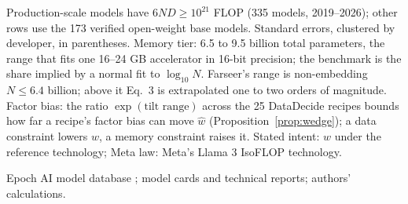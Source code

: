 \begin{table}[tp]
\begin{tabular}{@{}>{\raggedright\arraybackslash}p{}>{\raggedright\arraybackslash}p{}>{\raggedright\arraybackslash}p{}@{}}
\bottomrule
\end{tabular}
\par\smallskip
\begin{tablenotes}Production-scale models have $6ND\geq10^{21}$ FLOP (335 models, 2019--2026); other rows use the 173
verified open-weight base models. Standard errors, clustered by developer, in parentheses. Memory tier: 6.5 to 9.5
billion total parameters, the range that fits one 16--24 GB accelerator in 16-bit precision; the benchmark is the share
implied by a normal fit to $\log_{10}N$. Farseer's range is non-embedding $N\leq6.4$ billion; above it Eq.~3 is
extrapolated one to two orders of magnitude. Factor bias: the ratio $\exp(\text{tilt range})$ across the 25 DataDecide
recipes bounds how far a recipe's factor bias can move $\hat w$ (Proposition~\ref{prop:wedge}); a data constraint lowers
$w$, a memory constraint raises it. Stated intent: $\hat w$ under the reference technology; Meta law: Meta's Llama 3
IsoFLOP technology.\end{tablenotes}
\begin{tablenotes}[Source]Epoch AI model database \citep{epochai2026data}; model cards and technical reports; authors'
calculations.\end{tablenotes}
\end{table}
